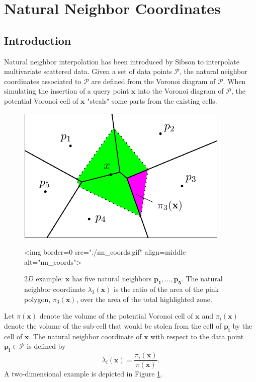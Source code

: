 \section{Natural Neighbor Coordinates\label{sec:coordinates}}
\subsection{Introduction}
Natural neighbor interpolation has been introduced by Sibson
\cite{s-bdnni-81} to interpolate multivariate scattered data.  Given
a set of data points $\mathcal{P}$, the natural neighbor coordinates
associated to $\mathcal{P}$ are defined from the Voronoi diagram of
$\mathcal{P}$.  When simulating the insertion of a query point
$\mathbf{x}$ into the Voronoi diagram of $\mathcal{P}$, the potential
Voronoi cell of $\mathbf{x}$ "steals" some parts from the existing
cells. 

\begin{figure}[ht!]
\begin{ccTexOnly}
\begin{center}
  \includegraphics{Interpolation/nn_coords}
\end{center}
\end{ccTexOnly}

\begin{ccHtmlOnly}
<img border=0 src="./nn_coords.gif"  align=middle  alt="nn_coords">
\end{ccHtmlOnly}

\caption{$2D$ example: $\mathbf{x}$ has five natural neighbors 
  $\mathbf{p_1},\ldots , \mathbf{p_5}$. 
  The natural neighbor coordinate $\lambda_3(\mathbf{x})$ is the ratio
  of the area of the pink polygon, $\pi_3(\mathbf{x})$, over the area
  of the total highlighted zone.
  \label{fig:nn_coords}}
\end{figure}



Let $\pi(\mathbf{x})$ denote the volume of the potential Voronoi cell
of $\mathbf{x}$ and $\pi_i(\mathbf{x})$ denote the volume of the
sub-cell that would be stolen from the cell of $\mathbf{p_i}$ by the
cell of $\mathbf{x}$.  The natural neighbor coordinate of $\mathbf{x}$
with respect to the data point $\mathbf{p_i}\in \mathcal{P}$ is defined by
$$
\lambda_i(\mathbf{x}) =
\frac{\pi_i(\mathbf{x})}{\pi(\mathbf{x})}.$$
A two-dimensional example
is depicted in Figure \ref{fig:nn_coords}.


